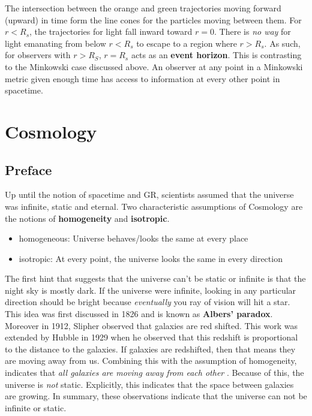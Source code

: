 \documentclass{article}
\begin{document}
The intersection between the orange and green trajectories moving forward (upward) in time form the line cones for the particles moving between them. For $r < R_s$, the trajectories for light fall inward toward $r = 0$. There is \textit{no way} for light emanating from below $r < R_s$ to escape to a region where $r > R_s$. As such, for observers with $r>R_S$, $r = R_s$ acts as an \textbf{event horizon}. This is contrasting to the Minkowski case discussed above. An observer at any point in a Minkowski metric given enough time has access to information at every other point in spacetime.

\section{Cosmology}

\subsection{Preface}
Up until the notion of spacetime and GR, scientists assumed that the universe was infinite, static and eternal. Two characteristic assumptions of Cosmology are the notions of \textbf{homogeneity} and \textbf{isotropic}.
\begin{itemize}
    \item homogeneous: Universe behaves/looks the same at every place
    \item isotropic: At every point, the universe looks the same in every direction
\end{itemize}
The first hint that suggests that the universe can't be static or infinite is that the night sky is mostly dark. If the universe were infinite, looking in any particular direction should be bright because \textit{eventually} you ray of vision will hit a star. This idea was first discussed in 1826 and is known as \textbf{Albers' paradox}. Moreover in 1912, Slipher observed that galaxies are red shifted. This work was extended by Hubble in 1929 when he observed that this redshift is proportional to the distance to the galaxies. If galaxies are redshifted, then that means they are moving away from us. Combining this with the assumption of homogeneity, indicates that \textit{all galaxies are moving away from each other}
. Because of this, the universe is \textit{not} static. Explicitly, this indicates that the space between galaxies are growing. In summary, these observations indicate that the universe can not be infinite or static. \\
\end{document}
